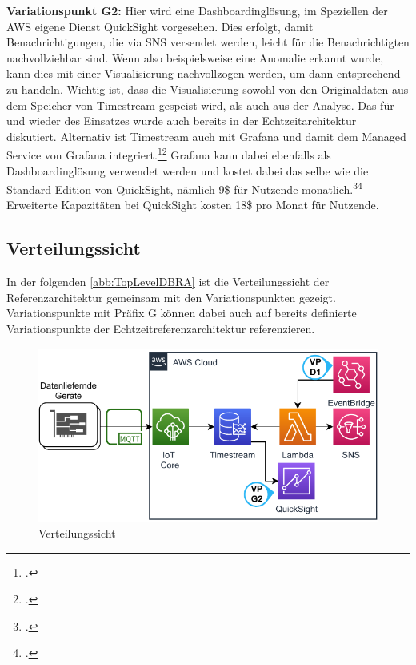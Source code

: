 \textbf{Variationspunkt G2:} Hier wird eine Dashboardinglösung, im Speziellen der \ac{AWS} eigene Dienst QuickSight vorgesehen. Dies erfolgt, damit Benachrichtigungen, die via \ac{SNS} versendet werden, leicht für die Benachrichtigten nachvollziehbar sind. Wenn also beispielsweise eine Anomalie erkannt wurde, kann dies mit einer Visualisierung nachvollzogen werden, um dann entsprechend zu handeln. Wichtig ist, dass die Visualisierung sowohl von den Originaldaten aus dem Speicher von Timestream gespeist wird, als auch aus der Analyse. Das für und wieder des Einsatzes wurde auch bereits in  der Echtzeitarchitektur diskutiert. Alternativ ist Timestream auch mit Grafana und damit dem Managed Service von Grafana integriert.\footcite[Vgl.][]{AmazonWebServicesInc..o.J.bm}\nzitat\footcite[Vgl.][]{Dutt.2020} Grafana kann dabei ebenfalls als Dashboardinglösung verwendet werden und kostet dabei das selbe wie die Standard Edition von QuickSight, nämlich 9\$ für Nutzende monatlich.\footcite[Vgl. auch im Foglenden][]{AmazonWebServicesInc..o.J.bn}\nzitat\footcite[Vgl.][]{AmazonWebServicesInc..o.J.bo} Erweiterte Kapazitäten bei QuickSight kosten 18\$ pro Monat für Nutzende. 



\subsection{Verteilungssicht}
In der folgenden \autoref{abb:TopLevelDBRA} ist die Verteilungssicht der Referenzarchitektur gemeinsam mit den Variationspunkten gezeigt. Variationspunkte mit Präfix G können dabei auch auf bereits definierte Variationspunkte der Echtzeitreferenzarchitektur referenzieren.
\begin{figure}[H]
\centering
\includegraphics[width=\textwidth]{graphics/DB-RA-Overview.pdf}
\caption{Verteilungssicht}
\label{abb:TopLevelDBRA}
\end{figure}

